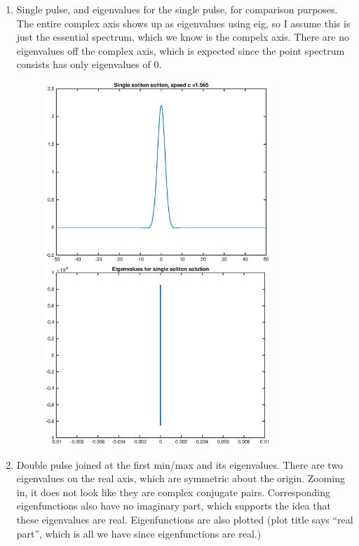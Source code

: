 \documentclass[12pt]{article}
\begin{document}
\begin{enumerate}

\item Single pulse, and eigenvalues for the single pulse, for comparison purposes. The entire complex axis shows up as eigenvalues using eig, so I assume this is just the essential spectrum, which we know is the compelx axis. There are no eigenvalues off the complex axis, which is expected since the point spectrum consists has only eigenvalues of 0.

\begin{figure}[H]
\includegraphics[width=8.5cm]{single.eps}
\includegraphics[width=8.5cm]{singleeig.eps}
\end{figure}

\item Double pulse joined at the first min/max and its eigenvalues. There are two eigenvalues on the real axis, which are symmetric about the origin. Zooming in, it does not look like they are complex conjugate pairs. Corresponding eigenfunctions also have no imaginary part, which supports the idea that these eigenvalues are real. Eigenfunctions are also plotted (plot title says ``real part'', which is all we have since eigenfunctions are real.)\\


\end{enumerate}
\end{document}
